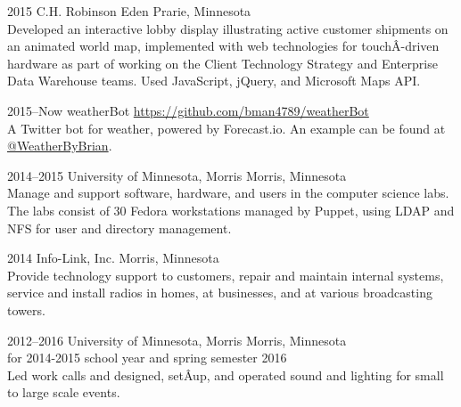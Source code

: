 \documentclass[]{cv-style} %
\begin{document}
\begin{entrylist}

\entry
{2015}
{C.H. Robinson}
{Eden Prarie, Minnesota}
{ \\
Developed an interactive lobby display illustrating active customer shipments on an animated world map, implemented with web technologies for touchÂ­-driven hardware as part of working on the Client Technology Strategy and Enterprise Data Warehouse teams. Used JavaScript, jQuery, and Microsoft Maps API.}


\entry
{2015--Now}
{weatherBot}
{\href{https://github.com/bman4789/weatherBot}{https://github.com/bman4789/weatherBot}}
{ \\
A Twitter bot for weather, powered by Forecast.io. An example can be found at \href{https://twitter.com/WeatherByBrian}{@WeatherByBrian}.}


\entry
{2014--2015}
{University of Minnesota, Morris}
{Morris, Minnesota}
{ \\
Manage and support software, hardware, and users in the computer science labs. The labs consist of 30 Fedora workstations managed by Puppet, using LDAP and NFS for user and directory management.}


\entry
{2014}
{Info-Link, Inc.}
{Morris, Minnesota}
{ \\
Provide technology support to customers, repair and maintain internal systems, service and install radios in homes, at businesses, and at various broadcasting towers.}


\entry
{2012--2016}
{University of Minnesota, Morris}
{Morris, Minnesota}
{ \\
 for 2014-2015 school year and spring semester 2016 \\
Led work calls and designed, setÂ­up, and operated sound and lighting for small to large scale events.
}


\end{entrylist}
\end{document}
